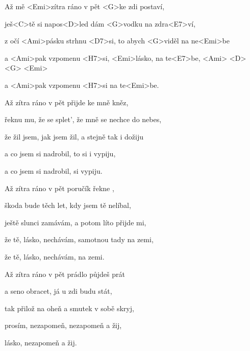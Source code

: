 

\zs
Až mě <Emi>zítra ráno v pět
<G>ke zdi postaví,

ješ<C>tě si napos<D>led
dám <G>vodku na zdra<E7>ví,

z očí <Ami>pásku strhnu <D7>si, to
abych <G>viděl na ne<Emi>be

a <Ami>pak vzpomenu <H7>si,
<Emi>lásko, na te<E7>be,
<Ami> <D> <G> <Emi>

a <Ami>pak vzpomenu <H7>si na te<Emi>be.
\ks

\zs
Až zítra ráno v pět přijde ke mně kněz,

řeknu mu, že se splet', že mně se nechce do nebes,

že žil jsem, jak jsem žil, a stejně tak i dožiju

a co jsem si nadrobil, to si i vypiju,

a co jsem si nadrobil, si vypiju.
\ks

\zs
Až zítra ráno v pět poručík řekne ,

škoda bude těch let, kdy jsem tě nelíbal,

ještě slunci zamávám, a potom líto přijde mi,

že tě, lásko, nechávám, samotnou tady na zemi,

že tě, lásko, nechávám, na zemi.
\ks

\zs
Až zítra ráno v pět prádlo půjdeš prát

a seno obracet, já u zdi budu stát,

tak přilož na oheň a smutek v sobě skryj,

prosím, nezapomeň, nezapomeň a žij,

lásko, nezapomeň a žij.
\ks

\kp
